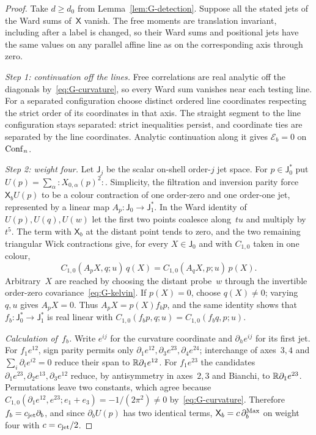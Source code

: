 \begin{proof}
Take $d\ge d_0$ from Lemma~\ref{lem:G-detection}. Suppose all the stated jets of the Ward sums of~$\mathsf X$ vanish. The free moments are translation invariant, including after a label is changed, so their Ward sums and positional jets have the same values on any parallel affine line as on the corresponding axis through zero.

\emph{Step 1: continuation off the lines.} Free correlations are real analytic off the diagonals by~\eqref{eq:G-curvature}, so every Ward sum vanishes near each testing line. For a separated configuration choose distinct ordered line coordinates respecting the strict order of its coordinates in that axis. The straight segment to the line configuration stays separated: strict inequalities persist, and coordinate ties are separated by the line coordinates. Analytic continuation along it gives $\mathcal E_b=0$ on~$\mathrm{Conf}_{n}$.

\emph{Step 2: weight four.} Let $\mathsf J_j$ be the scalar on-shell order-$j$ jet space. For $p\in\mathsf J_0^*$ put $U(p)=\sum_\alpha{:}X_{0,\alpha}(p)^2{:}$. Simplicity, the filtration and inversion parity force $\mathsf X_bU(p)$ to be a colour contraction of one order-zero and one order-one jet, represented by a linear map $A_p:\mathsf J_0\to\mathsf J_1^*$. In the Ward identity of $U(p),U(q),U(w)$ let the first two points coalesce along~$tu$ and multiply by~$t^5$. The term with $\mathsf X_b$ at the distant point tends to zero, and the two remaining triangular Wick contractions give, for every $X\in\mathsf J_0$ and with $C_{1,0}$ taken in one colour,
\begin{equation*}
C_{1,0}(A_pX,q;u)\,q(X)=C_{1,0}(A_qX,p;u)\,p(X).
\end{equation*}
Arbitrary~$X$ are reached by choosing the distant probe~$w$ through the invertible order-zero covariance~\eqref{eq:G-kelvin}. If $p(X)=0$, choose $q(X)\ne0$; varying $q,u$ gives $A_pX=0$. Thus $A_pX=p(X)f_bp$, and the same identity shows that $f_b:\mathsf J_0^*\to\mathsf J_1^*$ is real linear with $C_{1,0}(f_bp,q;u)=C_{1,0}(f_bq,p;u)$.

\emph{Calculation of~$f_b$.} Write $e^{ij}$ for the curvature coordinate and $\partial_he^{ij}$ for its first jet. For $f_1e^{12}$, sign parity permits only $\partial_1e^{12},\partial_3e^{23},\partial_4e^{24}$; interchange of axes~$3,4$ and $\sum_i\partial_ie^{i2}=0$ reduce their span to $\mathbb{R}\partial_1e^{12}$. For $f_1e^{23}$ the candidates $\partial_1e^{23},\partial_2e^{13},\partial_3e^{12}$ reduce, by antisymmetry in axes~$2,3$ and Bianchi, to $\mathbb{R}\partial_1e^{23}$. Permutations leave two constants, which agree because $C_{1,0}(\partial_1e^{12},e^{23};e_1+e_3)=-1/(2\pi^2)\ne0$ by~\eqref{eq:G-curvature}. Therefore $f_b=c_{\rm jet}\partial_b$, and since $\partial_bU(p)$ has two identical terms, $\mathsf X_b=c\,\partial^{\rm Max}_b$ on weight four with $c=c_{\rm jet}/2$.


\end{proof}

